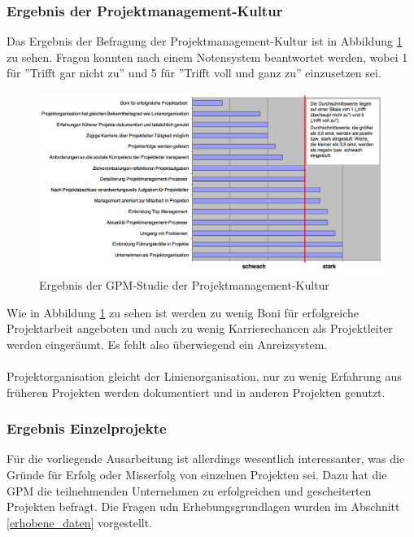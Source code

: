 \documentclass[12pt]{scrartcl}
\begin{document}
\subsubsection{Ergebnis der Projektmanagement-Kultur}

Das Ergebnis der Befragung der Projektmanagement-Kultur ist in Abbildung \ref{erfgebnis_gpm_studie_pmk} zu sehen. Fragen konnten nach einem Notensystem beantwortet werden, wobei 1 für ''Trifft gar nicht zu'' und 5 für ''Trifft voll und ganz zu'' einzusetzen sei. 

\begin{figure}[H]
	\begin{center}
		\includegraphics[width=1.0\textwidth]{img/ergebnis_gpm_studie_kultur}
		\caption{Ergebnis der GPM-Studie der Projektmanagement-Kultur}
		\label{erfgebnis_gpm_studie_pmk}	
	\end{center}
\end{figure}

Wie in Abbildung \ref{erfgebnis_gpm_studie_pmk} zu sehen ist werden zu wenig Boni für erfolgreiche Projektarbeit angeboten und auch zu wenig Karrierechancen als Projektleiter werden eingeräumt. Es fehlt also überwiegend ein Anreizsystem.\\
\\ 
Projektorganisation gleicht der Linienorganisation, nur zu wenig Erfahrung aus früheren Projekten werden dokumentiert und in anderen Projekten genutzt.

\subsubsection{Ergebnis Einzelprojekte}
Für die vorliegende Ausarbeitung ist allerdings wesentlich interessanter, was die Gründe für Erfolg oder Misserfolg von einzelnen Projekten sei. Dazu hat die GPM die teilnehmenden Unternehmen zu erfolgreichen und gescheiterten Projekten befragt. Die Fragen udn Erhebungsgrundlagen wurden im Abschnitt \ref{erhobene_daten} vorgestellt. 
\end{document}
